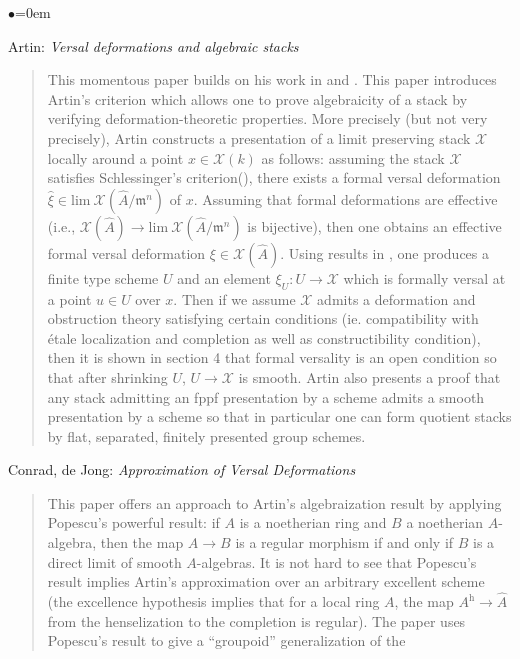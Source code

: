 \begin{list}{$\bullet$}{\leftmargin=0em}
\smallskip
\item
Artin: \emph{Versal deformations and algebraic stacks} \cite{artin_versal}
\begin{quote}
This momentous paper builds on his work in 
\cite{artin_approximation} and \cite{artin_algebraizationI}. This paper 
introduces Artin's criterion which allows one to prove algebraicity of a
stack by  verifying deformation-theoretic properties. More precisely (but
not very  precisely), Artin constructs a presentation of a limit preserving
stack  $\mathcal{X}$ 
locally around a point $x \in \mathcal{X}(k)$ as follows: assuming the stack 
$\mathcal{X}$ 
satisfies Schlessinger's criterion(\cite{schlessinger}), there exists a formal 
versal deformation
$\hat{\xi} \in \text{lim}\ \mathcal{X}(\hat A / \mathfrak m^n)$ of 
$x$. Assuming  that formal deformations are effective (i.e.,
$\mathcal{X}(\hat{A}) \to \text{lim}\ \mathcal{X}(\hat A  / \mathfrak m^n)$
is bijective), then one obtains an effective formal versal 
deformation $\xi \in \mathcal{X}(\hat A)$. Using results in 
\cite{artin_algebraizationI}, one produces a finite type scheme $U$ and an 
element $\xi_U: U \to \mathcal{X}$ which is formally versal at a point
$u \in U$ over $x$. Then if we assume $\mathcal{X}$ admits a deformation
and obstruction theory 
satisfying certain conditions (ie. compatibility with \'etale localization and 
completion as well as constructibility condition), then it is shown in section 
4 that formal versality is an open condition so that after shrinking $U$, $U 
\to \mathcal{X}$ is smooth.
Artin also presents a proof that any stack admitting an fppf presentation by 
a scheme admits a smooth presentation by a scheme so that in particular 
one can form quotient stacks by flat, separated, finitely presented group 
schemes.
\end{quote}
\smallskip
\item Conrad, de Jong: \emph{Approximation of Versal Deformations} 
\cite{conrad-dejong}
\begin{quote}
This paper offers an approach to Artin's algebraization result by applying 
Popescu's powerful result: if $A$ is a noetherian ring and $B$ a noetherian 
$A$-algebra, then the map $A \to B$ is a regular morphism if and only if $B$ 
is a direct limit of smooth $A$-algebras. It is not hard to see that Popescu's 
result implies Artin's approximation over an arbitrary excellent scheme (the 
excellence hypothesis implies that for a local ring $A$, the map $A^{\text{h}} 
\to \hat A$ from the henselization to the completion is regular).
The paper uses Popescu's result to give a ``groupoid'' generalization of the 

\end{quote}
\end{list}
